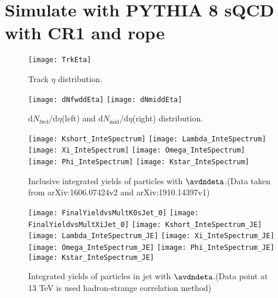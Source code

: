 
\section{Simulate with PYTHIA 8 sQCD with CR1 and rope}%
\label{sec:CRorRope}

\begin{figure}[t]
        \begin{center}
                \texttt{[image: TrkEta]}
        \end{center}
        \caption{Track $\eta$ distribution.}
        \label{fig:TrkEta}
\end{figure}

\begin{figure}[t]
	\begin{center}
		\texttt{[image: dNfwddEta]}
		\texttt{[image: dNmiddEta]}
	\end{center}
	\caption{$\mathrm{d}N_\mathrm{fwd}/\mathrm{d}\eta$(left) and $\mathrm{d}N_\mathrm{mid}/\mathrm{d}\eta$(right) distribution.}
	\label{fig:TrkdNdEta}
\end{figure}

\begin{figure}[ht]
	\begin{center}
		\texttt{[image: Kshort\_InteSpectrum]}
		\texttt{[image: Lambda\_InteSpectrum]}
		\texttt{[image: Xi\_InteSpectrum]}
		\texttt{[image: Omega\_InteSpectrum]}
		\texttt{[image: Phi\_InteSpectrum]}
		\texttt{[image: Kstar\_InteSpectrum]}
	\end{center}
	\caption{Inclusive integrated yields of particles with $\avdndeta$.(Data taken from arXiv:1606.07424v2 and arXiv:1910.14397v1)}
	\label{fig:InclIntePar}
\end{figure}
\begin{figure}[ht]
	\begin{center}
		\texttt{[image: FinalYieldvsMultK0sJet\_0]}
		\texttt{[image: FinalYieldvsMultXiJet\_0]}
		\texttt{[image: Kshort\_InteSpectrum\_JE]}
		\texttt{[image: Lambda\_InteSpectrum\_JE]}
		\texttt{[image: Xi\_InteSpectrum\_JE]}
		\texttt{[image: Omega\_InteSpectrum\_JE]}
		\texttt{[image: Phi\_InteSpectrum\_JE]}
		\texttt{[image: Kstar\_InteSpectrum\_JE]}
	\end{center}
	\caption{Integrated yields of particles in jet with $\avdndeta$.(Data point at 13 TeV is used hadron-strange correlation method)}
	\label{fig:JCIntePar}
\end{figure}

